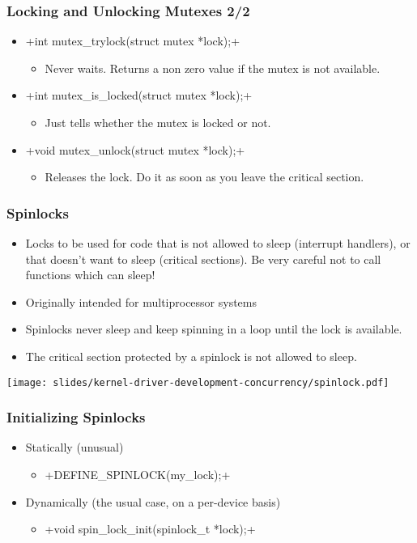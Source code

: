 \begin{frame}[fragile]
  \frametitle{Locking and Unlocking Mutexes 2/2}
  \begin{itemize}
  \item {}+int mutex_trylock(struct mutex *lock);+
    \begin{itemize}
    \item Never waits. Returns a non zero value if the mutex is not
      available.
    \end{itemize}
  \item {}+int mutex_is_locked(struct mutex *lock);+
    \begin{itemize}
    \item Just tells whether the mutex is locked or not.
    \end{itemize}
  \item {}+void mutex_unlock(struct mutex *lock);+
    \begin{itemize}
    \item Releases the lock. Do it as soon as you leave the critical
      section.
    \end{itemize}
  \end{itemize}
\end{frame}

\begin{frame}
  \frametitle{Spinlocks}
  \begin{itemize}
  \item Locks to be used for code that is not allowed to sleep
    (interrupt handlers), or that doesn't want to sleep (critical
    sections). Be very careful not to call functions which can sleep!
  \item Originally intended for multiprocessor systems
  \item Spinlocks never sleep and keep spinning in a loop until the
    lock is available.
  \item The critical section protected by a spinlock is not allowed to
    sleep.
  \end{itemize}
  \begin{center}
    \texttt{[image: slides/kernel-driver-development-concurrency/spinlock.pdf]}
  \end{center}
\end{frame}

\begin{frame}[fragile]
  \frametitle{Initializing Spinlocks}
  \begin{itemize}
  \item Statically (unusual)
    \begin{itemize}
    \item {}+DEFINE_SPINLOCK(my_lock);+
    \end{itemize}
  \item Dynamically (the usual case, on a per-device basis) 
    \begin{itemize}
    \item {}+void spin_lock_init(spinlock_t *lock);+
    \end{itemize}
  \end{itemize}
\end{frame}

